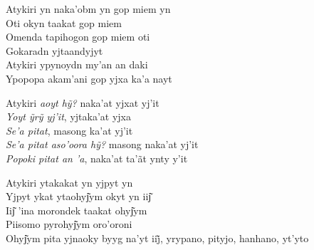 \noindent   Atykiri yn naka'obm yn gop miem yn\\
  Oti okyn taakat gop miem\\
  Omenda tapihogon gop miem oti\\
  Gokaradn yjtaandyjyt\\
  Atykiri ypynoydn my'an an daki\\
  Ypopopa akam'ani gop yjxa ka'a nayt
 
 \smallskip
 \begin{center}\end{center}
 \smallskip
 
\noindent   Atykiri \textit{aoyt hỹ?} naka’at yjxat yj’it\\
  \textit{Yoyt ỹrỹ yj’it}, yjtaka’at yjxa\\
  \textit{Se'a pitat}, masong ka'at yj'it\\
  \textit{Se’a pitat aso’oora hỹ?} masong naka’at yj’it\\
  \textit{Popoki pitat an 'a}, naka'at ta'ãt ynty y'it
 
 \smallskip
 \begin{center}\end{center}
 \smallskip
 
\noindent   Atykiri ytakakat yn yjpyt yn\\
  Yjpyt ykat ytaohyj͂ym okyt yn iij͂\\
  Iij͂ 'ina morondek taakat ohyj͂ym\\
  Piisomo pyrohyj͂ym oro'oroni\\
  Ohyj͂ym pita yjnaoky byyg na’yt iij̃, yrypano, pityjo, hanhano, yt’yto
 
